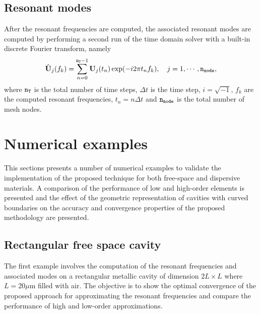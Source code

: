 
\subsection{Resonant modes}
\label{sc:modes}
After the resonant frequencies are computed, the associated resonant modes are computed by performing a second run of the time domain solver with a built-in discrete Fourier transform, namely
\begin{equation*}
    \hat{\mathbf{U}}_j(f_k) = \sum_{n=0}^{\texttt{n}_{\texttt{T}}-1} \mathbf{U}_j (t_n) \exp(-i2\pi t_n f_k), \quad j=1,\cdots,\texttt{n}_{\texttt{node}},
\end{equation*}
where $\texttt{n}_{\texttt{T}}$ is the total number of time steps, $\Delta t$ is the time step, $i = \sqrt{-1}$, $f_k$ are the computed resonant frequencies,  $t_n = n\Delta t$ and $\texttt{n}_{\texttt{node}}$ is the total number of mesh nodes.



\section{Numerical examples} 
\label{sc:examples}

This sections presents a number of numerical examples to validate the implementation of the proposed technique for both free-space and dispersive materials. A comparison of the performance of low and high-order elements is presented and the effect of the geometric representation of cavities with curved boundaries on the accuracy and convergence properties of the proposed methodology are presented.


\subsection{Rectangular free space cavity}
\label{sbc:freeSpace2D}

The first example involves the computation of the resonant frequencies and associated modes on a rectangular metallic cavity of dimension $2L \times L$ where $L=$20$\mu$m filled with air. The objective is to show the optimal convergence of the proposed approach for approximating the resonant frequencies and compare the performance of high and low-order approximations.  

